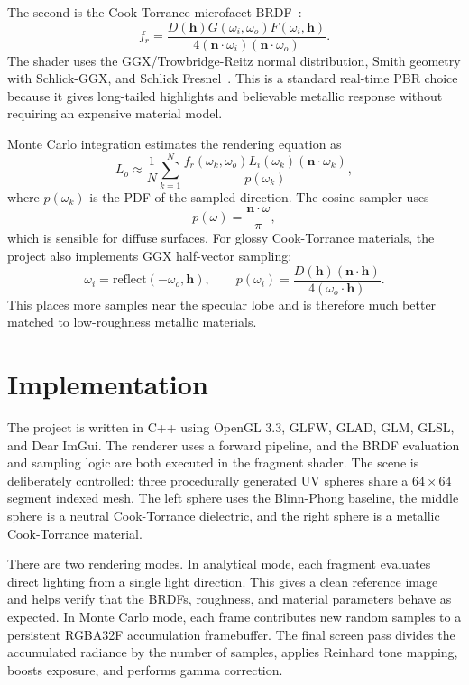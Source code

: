 \documentclass[12pt]{article}
\begin{document}
The second is the Cook-Torrance microfacet BRDF~\cite{cook1982reflectance}:
\begin{equation}
f_r =
\frac{D(\mathbf{h})G(\omega_i,\omega_o)F(\omega_i,\mathbf{h})}
{4(\mathbf{n}\cdot\omega_i)(\mathbf{n}\cdot\omega_o)} .
\end{equation}
The shader uses the GGX/Trowbridge-Reitz normal distribution, Smith geometry with Schlick-GGX, and Schlick Fresnel~\cite{walter2007microfacet,schlick1994inexpensive}. This is a standard real-time PBR choice because it gives long-tailed highlights and believable metallic response without requiring an expensive material model.

Monte Carlo integration estimates the rendering equation as
\begin{equation}
L_o \approx
\frac{1}{N}
\sum_{k=1}^{N}
\frac{
f_r(\omega_k,\omega_o)L_i(\omega_k)(\mathbf{n}\cdot\omega_k)
}{p(\omega_k)} ,
\end{equation}
where $p(\omega_k)$ is the PDF of the sampled direction. The cosine sampler uses
\begin{equation}
p(\omega) = \frac{\mathbf{n}\cdot\omega}{\pi},
\end{equation}
which is sensible for diffuse surfaces. For glossy Cook-Torrance materials, the project also implements GGX half-vector sampling:
\begin{equation}
\omega_i = \mathrm{reflect}(-\omega_o,\mathbf{h}), \qquad
p(\omega_i) =
\frac{D(\mathbf{h})(\mathbf{n}\cdot\mathbf{h})}
{4(\omega_o\cdot\mathbf{h})}.
\end{equation}
This places more samples near the specular lobe and is therefore much better matched to low-roughness metallic materials.

\section{Implementation}

The project is written in C++ using OpenGL 3.3, GLFW, GLAD, GLM, GLSL, and Dear ImGui. The renderer uses a forward pipeline, and the BRDF evaluation and sampling logic are both executed in the fragment shader. The scene is deliberately controlled: three procedurally generated UV spheres share a $64 \times 64$ segment indexed mesh. The left sphere uses the Blinn-Phong baseline, the middle sphere is a neutral Cook-Torrance dielectric, and the right sphere is a metallic Cook-Torrance material.

There are two rendering modes. In analytical mode, each fragment evaluates direct lighting from a single light direction. This gives a clean reference image and helps verify that the BRDFs, roughness, and material parameters behave as expected. In Monte Carlo mode, each frame contributes new random samples to a persistent RGBA32F accumulation framebuffer. The final screen pass divides the accumulated radiance by the number of samples, applies Reinhard tone mapping, boosts exposure, and performs gamma correction.
\end{document}
